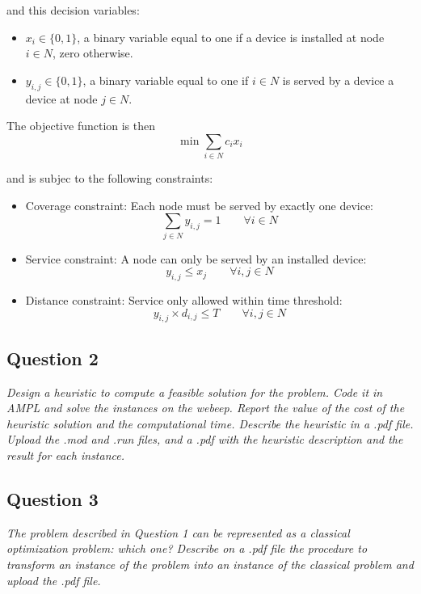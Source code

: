 \documentclass[10pt]{article}
\begin{document}
    and this decision variables:
    \begin{itemize}
        \item $x_i \in \{0,1\}$, a binary variable equal to one if a device is installed at node $i \in N$, zero otherwise.
        \item $y_{i,j} \in \{0,1\}$, a binary variable equal to one if $i \in N$ is served by a device a device at node $j \in N$.
    \end{itemize}

    The objective function is then
    \begin{equation}
        \min \sum_{i \in N} c_i x_i
    \end{equation}

    and is subjec to the following constraints:
    \begin{itemize}
        \item Coverage constraint: Each node must be served by exactly one device:
        \[
            \sum_{j \in N} y_{i,j} = 1 \qquad \forall i \in N
        \]
        \item Service constraint: A node can only be served by an installed device:
        \[
            y_{i,j} \le x_j \qquad \forall i,j \in N
        \]
        \item Distance constraint: Service only allowed within time threshold:
        \[
            y_{i,j} \times d_{i,j} \le T \qquad \forall i,j \in N
        \]
    \end{itemize}








    \subsection*{Question 2}
    \textit{Design a heuristic to compute a feasible solution for the problem. Code it in AMPL and solve the instances on the webeep. Report the value of the cost of the heuristic solution and the computational time. Describe the heuristic in a .pdf file. Upload the .mod and .run files, and a .pdf with the heuristic description and the result for each instance.}

    \subsection*{Question 3}
    \textit{The problem described in Question 1 can be represented as a classical optimization problem: which one? Describe on a .pdf file the procedure to transform an instance of the problem into an instance of the classical problem and upload the .pdf file.}
\end{document}
